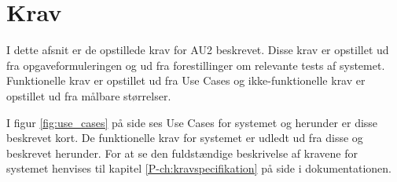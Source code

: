 \chapter{Krav}\label{ch:Krav} %

I dette afsnit er de opstillede krav for AU2 beskrevet.
Disse krav er opstillet ud fra opgaveformuleringen og ud fra forestillinger om relevante tests af systemet. Funktionelle krav er opstillet ud fra Use Cases og ikke-funktionelle krav er opstillet ud fra målbare størrelser.

I figur \ref{fig:use_cases} på side \pageref{fig:use_cases} ses Use Cases for systemet og herunder er disse beskrevet kort. De funktionelle krav for systemet er udledt ud fra disse og beskrevet herunder. For at se den fuldstændige beskrivelse af kravene for systemet henvises til kapitel \ref{P-ch:kravspecifikation}  på side \pageref{P-ch:kravspecifikation} i dokumentationen.

